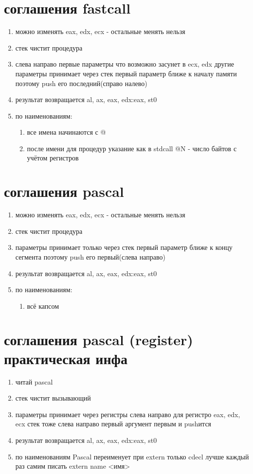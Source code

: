 \documentclass[a4paper,10pt]{article}
\begin{document}
\section*{соглашения fastcall}
\begin{enumerate}
    \item можно изменять eax, edx, ecx - остальные менять нельзя
    \item стек чистит процедура
    \item слева направо первые параметры что возможно засунет в ecx, edx другие параметры принимает через стек первый параметр ближе к началу памяти поэтому push его последний(справо налево)
    \item результат возвращается al, ax, eax, edx:eax, st0
    \item по наименованиям:
    \begin{enumerate}
        \item все имена начинаются с @
        \item после имени для процедур указание как в stdcall @N - число байтов с учётом регистров
    \end{enumerate}
\end{enumerate}
\section*{соглашения pascal}
\begin{enumerate}
    \item можно изменять eax, edx, ecx - остальные менять нельзя
    \item стек чистит процедура 
    \item параметры принимает только через стек первый параметр ближе к концу сегмента поэтому push его первый(слева направо)
    \item результат возвращается al, ax, eax, edx:eax, st0
    \item по наименованиям:
    \begin{enumerate}
        \item всё капсом
    \end{enumerate}
\end{enumerate}
\section*{соглашения pascal (register) практическая инфа}
\begin{enumerate}
    \item читай pascal
    \item стек чистит вызывающий
    \item параметры принимает через регистры слева направо для регистро eax, edx, ecx стек тоже слева направо первый аргумент первым и pushится
    \item результат возвращается al, ax, eax, edx:eax, st0
    \item по наименованиям Pascal переименует при extern только cdecl лучше каждый раз самим писать extern name <имя>
\end{enumerate}
\end{document}
